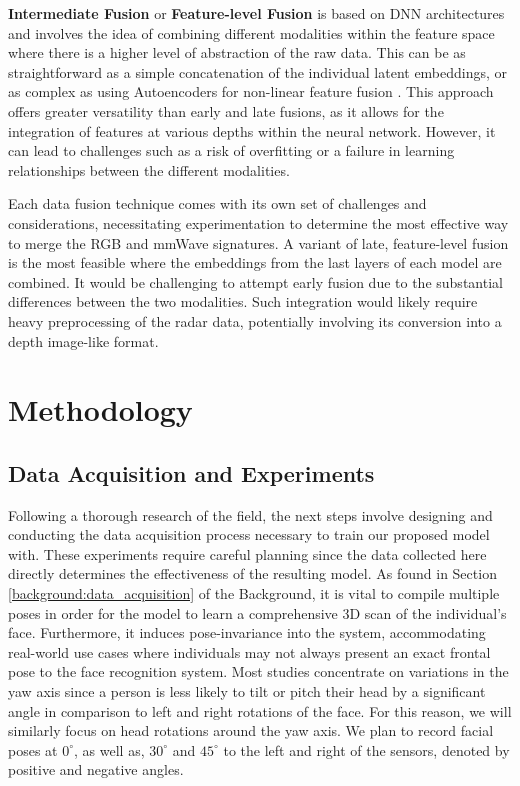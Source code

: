 \documentclass{mpaper}
\begin{document}
\textbf{Intermediate Fusion} or \textbf{Feature-level Fusion} is based on DNN architectures and involves the idea of combining different modalities within the feature space where there is a higher level of abstraction of the raw data. This can be as straightforward as a simple concatenation of the individual latent embeddings, or as complex as using Autoencoders for non-linear feature fusion \cite{charte2018practical}. This approach offers greater versatility than early and late fusions, as it allows for the integration of features at various depths within the neural network. However, it can lead to challenges such as a risk of overfitting or a failure in learning relationships between the different modalities.

Each data fusion technique comes with its own set of challenges and considerations, necessitating experimentation to determine the most effective way to merge the RGB and mmWave signatures. A variant of late, feature-level fusion is the most feasible where the embeddings from the last layers of each model are combined. It would be challenging to attempt early fusion due to the substantial differences between the two modalities. Such integration would likely require heavy preprocessing of the radar data, potentially involving its conversion into a depth image-like format. 



\section{Methodology}

\subsection{Data Acquisition and Experiments}
Following a thorough research of the field, the next steps involve designing and conducting the data acquisition process necessary to train our proposed model with. These experiments require careful planning since the data collected here directly determines the effectiveness of the resulting model. As found in Section \ref{background:data_acquisition} of the Background, it is vital to compile multiple poses in order for the model to learn a comprehensive 3D scan of the individual's face. Furthermore, it induces pose-invariance into the system, accommodating real-world use cases where individuals may not always present an exact frontal pose to the face recognition system. Most studies concentrate on variations in the yaw axis since a person is less likely to tilt or pitch their head by a significant angle in comparison to left and right rotations of the face. For this reason, we will similarly focus on head rotations around the yaw axis. We plan to record facial poses at $0^\circ$, as well as, $30^\circ$ and $45^\circ$ to the left and right of the sensors, denoted by positive and negative angles. 
\end{document}
